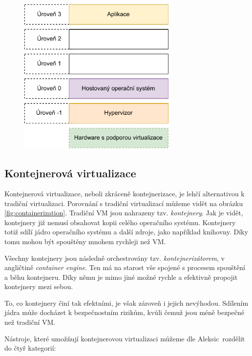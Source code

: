 \begin{figure}[H]
    \centering 
    \includegraphics[width=0.7\textwidth]{assets/img/hardware-asssist-virt.pdf}
    \label{fig:hardware_asssist_virt}
\end{figure}

\subsection{Kontejnerová virtualizace}

Kontejnerová virtualizace, neboli zkráceně kontejnerizace, je lehčí alternativou k tradiční virtualizaci. Porovnání s tradiční virtualizací můžeme vidět na obrázku \ref{fig:containerization}. Tradiční VM jsou nahrazeny tzv. \textit{kontejnery}. Jak je vidět, kontejnery již nemusí obsahovat kopii celého operačního systému. Kontejnery totiž sdílí jádro operačního systému a další zdroje, jako například knihovny. Díky tomu mohou být spouštěny mnohem rychleji než VM.\,\cite{8693491}

Všechny kontejnery jsou následně orchestrovány tzv. \textit{kontejnerizátorem}, v angličtině \textit{container engine}. Ten má na starost vše spojené s procesem spouštění a běhu kontejneru. Díky němu je mimo jiné možné rychle a efektivně propojit kontejnery mezi sebou.\,\cite{Bentaleb2021} 

To, co kontejnery činí tak efektními, je však zároveň i jejich nevýhodou. Sdílením jádra může docházet k bezpečnostním rizikům, kvůli čemuž jsou méně bezpečné než tradiční VM.\,\cite{6498558}

Nástroje, které umožňují kontejnerovou virtualizaci můžeme dle Aleksic\,\cite{docker_alt_23} rozdělit do čtyř kategorií:

